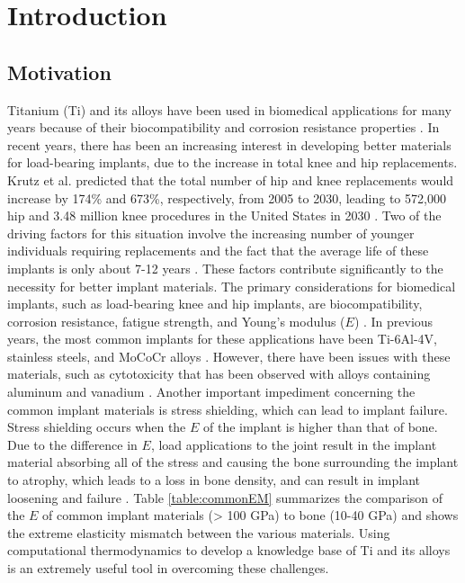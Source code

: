 \chapter{Introduction} \label{chapter1:introduction}

\section{\sloppy Motivation}
Titanium (Ti) and its alloys have been used in biomedical applications for many years because of their biocompatibility and corrosion resistance properties \cite{Long1998a}. In recent years, there has been an increasing interest in developing better materials for load-bearing implants, due to the increase in total knee and hip replacements. Krutz et al. predicted that the total number of hip and knee replacements would increase by 174\% and 673\%, respectively, from 2005 to 2030, leading to 572,000 hip and 3.48 million knee procedures in the United States in 2030 \cite{Kurtz2007}. Two of the driving factors for this situation involve the increasing number of younger individuals requiring replacements and the fact that the average life of these implants is only about 7-12 years \cite{Krishna2007a}. These factors contribute significantly to the necessity for better implant materials. The primary considerations for biomedical implants, such as load-bearing knee and hip implants, are biocompatibility, corrosion resistance, fatigue strength, and Young's modulus ($E$) \cite{Long1998a}. In previous years, the most common implants for these applications have been Ti-6Al-4V, stainless steels, and MoCoCr alloys \cite{Niinomi2003,Niinomi2012}. However, there have been issues with these materials, such as cytotoxicity that has been observed with alloys containing aluminum and vanadium \cite{Ito1995a}. Another important impediment concerning the common implant materials is stress shielding, which can lead to implant failure. Stress shielding occurs when the $E$ of the implant is higher than that of bone. Due to the difference in $E$, load applications to the joint result in the implant material absorbing all of the stress and causing the bone surrounding the implant to atrophy, which leads to a loss in bone density, and can result in implant loosening and failure \cite{Long1998a}.  Table \ref{table:commonEM} summarizes the comparison of the $E$ of common implant materials (> 100 GPa) to bone (10-40 GPa) \cite{Long1998a} and shows the extreme elasticity mismatch between the various materials. Using computational thermodynamics to develop a knowledge base of Ti and its alloys is an extremely useful tool in overcoming these challenges. 

